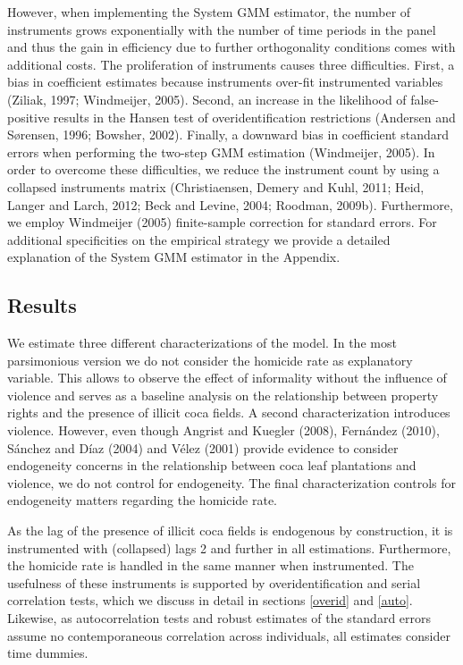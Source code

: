 However, when implementing the System GMM estimator, the number of instruments grows exponentially with the number of time periods in the panel and thus the gain in efficiency due to further orthogonality conditions comes with additional costs. The proliferation of instruments causes three difficulties. First, a bias in coefficient estimates because instruments over-fit instrumented variables (Ziliak, 1997; Windmeijer, 2005). Second, an increase in the likelihood of false-positive results in the Hansen test of overidentification restrictions (Andersen and S\o rensen,  1996; Bowsher, 2002). Finally, a downward bias in coefficient standard errors when performing the two-step GMM estimation (Windmeijer, 2005). In order to overcome these difficulties, we reduce the instrument count by using a collapsed instruments matrix (Christiaensen, Demery and Kuhl, 2011; Heid, Langer and Larch, 2012; Beck and Levine, 2004; Roodman, 2009b). Furthermore, we employ Windmeijer (2005) finite-sample correction for standard errors. For additional specificities on the empirical strategy we provide a detailed explanation of the System GMM estimator in the Appendix.

\subsection{Results}
\label{results}

We estimate three different characterizations of the model. In the most parsimonious version we do not consider the homicide rate as explanatory variable. This allows to observe the effect of informality without the influence of violence and serves as a baseline analysis on the relationship between property rights and the presence of illicit coca fields. A second characterization introduces violence. However, even though Angrist and Kuegler (2008), Fern\'{a}ndez (2010), S\'{a}nchez and D\'{i}az (2004) and V\'{e}lez (2001) provide evidence to consider endogeneity concerns in the relationship between coca leaf plantations and violence, we do not control for endogeneity. The final characterization controls for endogeneity matters regarding the homicide rate. 

As the lag of the presence of illicit coca fields is endogenous by construction, it is instrumented with (collapsed) lags 2 and further in all estimations. Furthermore, the homicide rate is handled in the same manner when instrumented. The usefulness of these instruments is supported by overidentification and serial correlation tests, which we discuss in detail in sections \ref{overid} and \ref{auto}. Likewise, as autocorrelation tests and robust estimates of the standard errors assume no contemporaneous correlation across individuals, all estimates consider time dummies.

